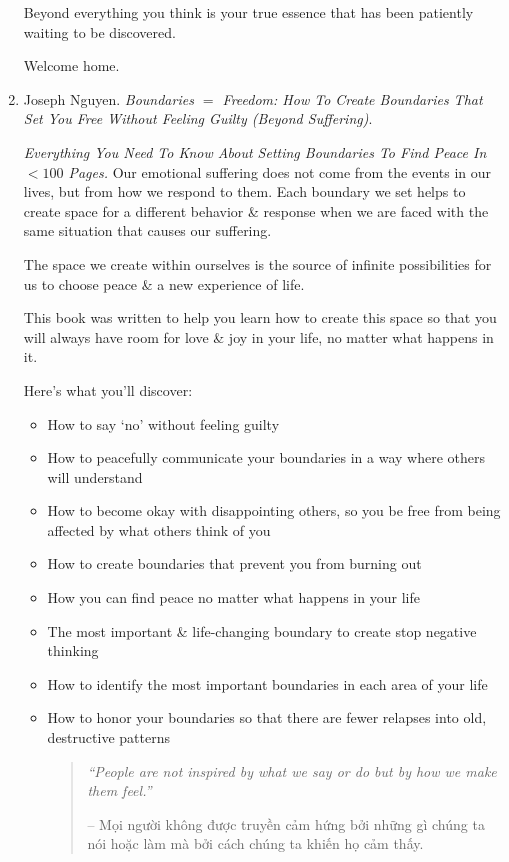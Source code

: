\documentclass{article}
\begin{document}
\begin{enumerate}
	Beyond everything you think is your true essence that has been patiently waiting to be discovered.
	
	Welcome home.
	\item {\sc Joseph Nguyen}. {\it Boundaries $=$ Freedom: How To Create Boundaries That Set You Free Without Feeling Guilty (Beyond Suffering)}. {}
	
	{\it Everything You Need To Know About Setting Boundaries To Find Peace In $< 100$ Pages.} Our emotional suffering does not come from the events in our lives, but from how we respond to them. Each boundary we set helps to create space for a different behavior \& response when we are faced with the same situation that causes our suffering.
	
	The space we create within ourselves is the source of infinite possibilities for us to choose peace \& a new experience of life.
	
	This book was written to help you learn how to create this space so that you will always have room for love \& joy in your life, no matter what happens in it.
	
	Here's what you'll discover:
	\begin{itemize}
		\item How to say `no' without feeling guilty
		\item How to peacefully communicate your boundaries in a way where others will understand
		\item How to become okay with disappointing others, so you be free from being affected by what others think of you
		\item How to create boundaries that prevent you from burning out
		\item How you can find peace no matter what happens in your life
		\item The most important \& life-changing boundary to create stop negative thinking
		\item How to identify the most important boundaries in each area of your life
		\item How to honor your boundaries so that there are fewer relapses into old, destructive patterns
		\begin{quotation}
			{\it``People are not inspired by what we say or do but by how we make them feel.''}
			
			-- Mọi người không được truyền cảm hứng bởi những gì chúng ta nói hoặc làm mà bởi cách chúng ta khiến họ cảm thấy.
			

\end{quotation}
\end{itemize}
\end{enumerate}
\end{document}

